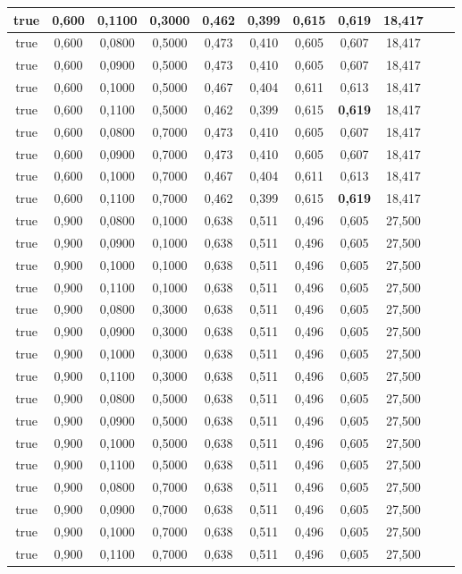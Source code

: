 \documentclass{article}
\begin{document}
\begin{longtable}[c]{|c|c|c|c|c|c|c|c|c|c|c|}
 true & 0,600 & 0,1100 & 0,3000 & 0,462 & 0,399 & 0,615 & \cellcolor{gray!20} \textbf{0,619} & 18,417  \\ \hline 
 true & 0,600 & 0,0800 & 0,5000 & 0,473 & 0,410 & 0,605 & 0,607 & 18,417  \\ \hline 
 true & 0,600 & 0,0900 & 0,5000 & 0,473 & 0,410 & 0,605 & 0,607 & 18,417  \\ \hline 
 true & 0,600 & 0,1000 & 0,5000 & 0,467 & 0,404 & 0,611 & 0,613 & 18,417  \\ \hline 
 true & 0,600 & 0,1100 & 0,5000 & 0,462 & 0,399 & 0,615 & \cellcolor{gray!20} \textbf{0,619} & 18,417  \\ \hline 
 true & 0,600 & 0,0800 & 0,7000 & 0,473 & 0,410 & 0,605 & 0,607 & 18,417  \\ \hline 
 true & 0,600 & 0,0900 & 0,7000 & 0,473 & 0,410 & 0,605 & 0,607 & 18,417  \\ \hline 
 true & 0,600 & 0,1000 & 0,7000 & 0,467 & 0,404 & 0,611 & 0,613 & 18,417  \\ \hline 
 true & 0,600 & 0,1100 & 0,7000 & 0,462 & 0,399 & 0,615 & \cellcolor{gray!20} \textbf{0,619} & 18,417  \\ \hline 
 true & 0,900 & 0,0800 & 0,1000 & 0,638 & 0,511 & 0,496 & 0,605 & 27,500  \\ \hline 
 true & 0,900 & 0,0900 & 0,1000 & 0,638 & 0,511 & 0,496 & 0,605 & 27,500  \\ \hline 
 true & 0,900 & 0,1000 & 0,1000 & 0,638 & 0,511 & 0,496 & 0,605 & 27,500  \\ \hline 
 true & 0,900 & 0,1100 & 0,1000 & 0,638 & 0,511 & 0,496 & 0,605 & 27,500  \\ \hline 
 true & 0,900 & 0,0800 & 0,3000 & 0,638 & 0,511 & 0,496 & 0,605 & 27,500  \\ \hline 
 true & 0,900 & 0,0900 & 0,3000 & 0,638 & 0,511 & 0,496 & 0,605 & 27,500  \\ \hline 
 true & 0,900 & 0,1000 & 0,3000 & 0,638 & 0,511 & 0,496 & 0,605 & 27,500  \\ \hline 
 true & 0,900 & 0,1100 & 0,3000 & 0,638 & 0,511 & 0,496 & 0,605 & 27,500  \\ \hline 
 true & 0,900 & 0,0800 & 0,5000 & 0,638 & 0,511 & 0,496 & 0,605 & 27,500  \\ \hline 
 true & 0,900 & 0,0900 & 0,5000 & 0,638 & 0,511 & 0,496 & 0,605 & 27,500  \\ \hline 
 true & 0,900 & 0,1000 & 0,5000 & 0,638 & 0,511 & 0,496 & 0,605 & 27,500  \\ \hline 
 true & 0,900 & 0,1100 & 0,5000 & 0,638 & 0,511 & 0,496 & 0,605 & 27,500  \\ \hline 
 true & 0,900 & 0,0800 & 0,7000 & 0,638 & 0,511 & 0,496 & 0,605 & 27,500  \\ \hline 
 true & 0,900 & 0,0900 & 0,7000 & 0,638 & 0,511 & 0,496 & 0,605 & 27,500  \\ \hline 
 true & 0,900 & 0,1000 & 0,7000 & 0,638 & 0,511 & 0,496 & 0,605 & 27,500  \\ \hline 
 true & 0,900 & 0,1100 & 0,7000 & 0,638 & 0,511 & 0,496 & 0,605 & 27,500  \\ \hline 
 \end{longtable} 
\end{document}
